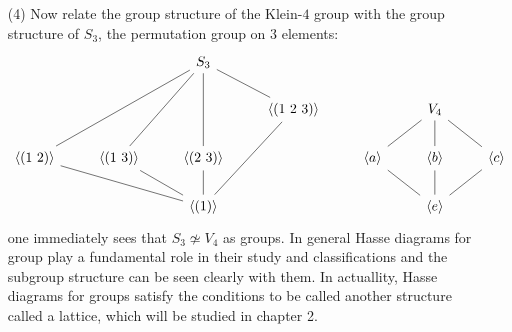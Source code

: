 \begin{example}
\begin{enumerate}
    \item[(4)] Now relate the group structure of the Klein-$4$ group
      with the group structure of $S_3$, the permutation group on $3$
      elements:
      \[\begin{tikzcd}
  && {S_3} \\
  &&& {\langle (1 \ 2 \ 3) \rangle} && {V_4} \\
        {\langle (1 \ 2) \rangle} & {\langle (1 \ 3) \rangle} & {\langle (2 \ 3) \rangle} && {\langle a \rangle} & {\langle b \rangle} & {\langle c \rangle} \\
                                  && {\langle (1) \rangle} &&& {\langle e \rangle}
                                  \arrow[no head, from=1-3, to=2-4]
                                  \arrow[no head, from=1-3, to=3-1]
                                  \arrow[no head, from=2-4, to=4-3]
                                  \arrow[no head, from=2-6, to=3-5]
                                  \arrow[no head, from=3-1, to=4-3]
                                  \arrow[no head, from=3-2, to=1-3]
                                  \arrow[no head, from=3-3, to=1-3]
                                  \arrow[no head, from=3-5, to=4-6]
                                  \arrow[no head, from=3-6, to=2-6]
                                  \arrow[no head, from=3-7, to=2-6]
                                  \arrow[no head, from=4-3, to=3-2]
                                  \arrow[no head, from=4-3, to=3-3]
                                  \arrow[no head, from=4-6, to=3-6]
                                  \arrow[no head, from=4-6, to=3-7]
      \end{tikzcd}\]
      one immediately sees that $S_3 \not\simeq V_4$ as groups. In
      general Hasse diagrams for group play a fundamental role in
      their study and classifications and the subgroup structure can
      be seen clearly with them. In actuallity, Hasse diagrams for
      groups satisfy the conditions to be called another structure
      called a lattice, which will be studied in chapter 2.
  \end{enumerate}
\end{example}
